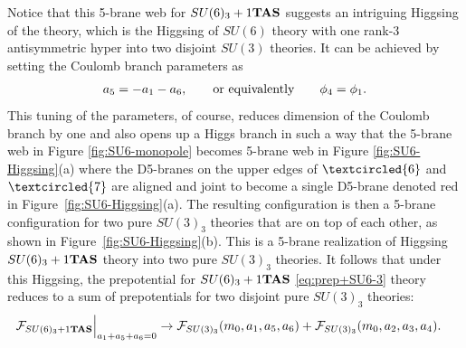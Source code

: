 \documentclass[letterpaper, 11pt]{article}
\begin{document}
{Notice that this 5-brane web for $SU(6)_3+1{\bf TAS}$ suggests an intriguing Higgsing of the theory, which is the Higgsing of $SU(6)$ theory with one rank-3 antisymmetric hyper into two disjoint $SU(3)$ theories. It can be achieved by setting the Coulomb branch parameters as
 \begin{align}
 	a_5= - a_1-a_6, \qquad {\rm or~equivalently} \qquad \phi_4=\phi_1. \label{eq:HiggisingToSU3}
 \end{align}
 This tuning of the parameters, of course, reduces dimension of the Coulomb branch by one and also opens up a Higgs branch in such a way that the 5-brane web in Figure \ref{fig:SU6-monopole} becomes 5-brane web in Figure \ref{fig:SU6-Higgsing}(a) where the D5-branes on the upper edges of $\textcircled{\scriptsize 6}$ and $\textcircled{\scriptsize 7}$ are aligned and joint to become a single D5-brane denoted red in Figure~\ref{fig:SU6-Higgsing}(a). The resulting configuration is then a 5-brane configuration for two pure $SU(3)_3$ theories that are on top of each other, as shown in Figure~\ref{fig:SU6-Higgsing}(b). This is a 5-brane realization of Higgsing $SU(6)_3+1{\bf TAS}$ theory into two pure $SU(3)_3$ theories. It follows that 
 under this Higgsing, the prepotential for $SU(6)_3+1{\bf TAS}$ \eqref{eq:prep+SU6-3} theory reduces to a sum of prepotentials for two disjoint pure $SU(3)_3$ theories:
\begin{align}
\mathcal{F}_{SU(6)_{3}+1{\bf TAS}}{}\Big|_{a_1+a_5+a_6=0}	%
&\rightarrow \mathcal{F}_{SU(3)_3}(m_0,a_1,a_5,a_6)+\mathcal{F}_{SU(3)_3}(m_0,a_2,a_3,a_4).
\end{align}
}
\end{document}
